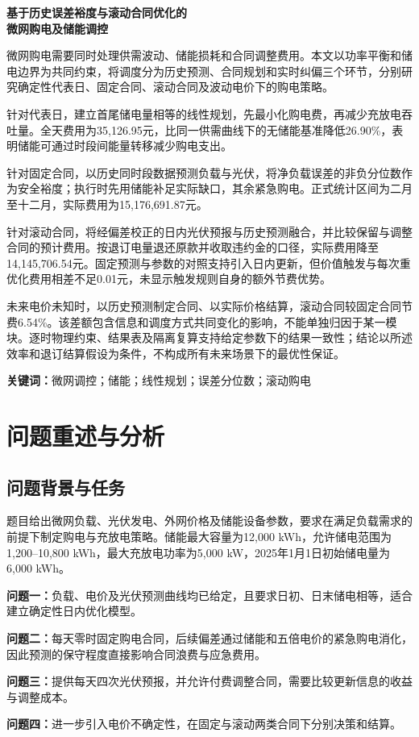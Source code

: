 \documentclass[12pt,a4paper,fontset=windows]{ctexart}
\begin{document}
\begin{center}{\LARGE\bfseries 基于历史误差裕度与滚动合同优化的\\微网购电及储能调控}\par\vspace{1em}{\large\bfseries 摘要}\end{center}
微网购电需要同时处理供需波动、储能损耗和合同调整费用。本文以功率平衡和储电边界为共同约束，将调度分为历史预测、合同规划和实时纠偏三个环节，分别研究确定性代表日、固定合同、滚动合同及波动电价下的购电策略。

针对代表日，建立首尾储电量相等的线性规划，先最小化购电费，再减少充放电吞吐量。全天费用为35,126.95元，比同一供需曲线下的无储能基准降低26.90\%，表明储能可通过时段间能量转移减少购电支出。

针对固定合同，以历史同时段数据预测负载与光伏，将净负载误差的非负分位数作为安全裕度；执行时先用储能补足实际缺口，其余紧急购电。正式统计区间为二月至十二月，实际费用为15,176,691.87元。

针对滚动合同，将经偏差校正的日内光伏预报与历史预测融合，并比较保留与调整合同的预计费用。按退订电量退还原款并收取违约金的口径，实际费用降至14,145,706.54元。固定预测与参数的对照支持引入日内更新，但价值触发与每次重优化费用相差不足0.01元，未显示触发规则自身的额外节费优势。

未来电价未知时，以历史预测制定合同、以实际价格结算，滚动合同较固定合同节费6.54\%。该差额包含信息和调度方式共同变化的影响，不能单独归因于某一模块。逐时物理约束、结果表及隔离复算支持给定参数下的结果一致性；结论以所述效率和退订结算假设为条件，不构成所有未来场景下的最优性保证。

\vspace{0.8em}\noindent\textbf{关键词：}微网调控；储能；线性规划；误差分位数；滚动购电
\newpage
\section{问题重述与分析}
\subsection{问题背景与任务}
题目给出微网负载、光伏发电、外网价格及储能设备参数\cite{problem}，要求在满足负载需求的前提下制定购电与充放电策略。储能最大容量为12,000 kWh，允许储电范围为1,200--10,800 kWh，最大充放电功率为5,000 kW，2025年1月1日初始储电量为6,000 kWh。

\textbf{问题一：}负载、电价及光伏预测曲线均已给定，且要求日初、日末储电相等，适合建立确定性日内优化模型。\par\textbf{问题二：}每天零时固定购电合同，后续偏差通过储能和五倍电价的紧急购电消化，因此预测的保守程度直接影响合同浪费与应急费用。\par\textbf{问题三：}提供每天四次光伏预报，并允许付费调整合同，需要比较更新信息的收益与调整成本。\par\textbf{问题四：}进一步引入电价不确定性，在固定与滚动两类合同下分别决策和结算。
\end{document}
